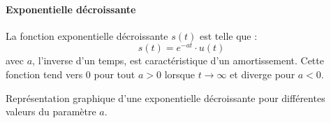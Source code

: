 \paragraph{Exponentielle décroissante}
La fonction exponentielle décroissante $s(t)$ est telle que :
\[
    s(t)=e^{-at}\cdot u(t)
\]
avec $a$, l'inverse d'un temps, est caractéristique d'un amortissement.
Cette fonction tend vers 0 pour tout $a>0$ lorsque $t\rightarrow\infty$ et 
diverge pour $a<0$.
\begin{marginfigure}[-9em]
    \captionsetup{width=0.95\linewidth,belowskip=0pt,labelfont=bf} 
    \centering
    \resizebox{\linewidth}{!}{}
    \caption{Représentation graphique d'une exponentielle décroissante pour 
             différentes valeurs du paramètre $a$.\label{fig-exp}}
\end{marginfigure}
